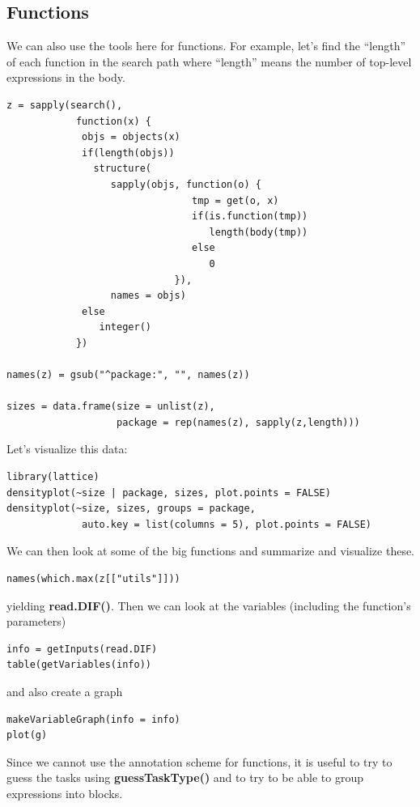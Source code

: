 \documentclass{article}
\def\Rfunc#1{\textbf{#1()}}
\begin{document}
\subsection{Functions}
We can also use the tools here for functions.
For example, let's find the ``length'' of
each function in the search path where ``length''
means the number of top-level expressions in the 
body.
\begin{verbatim}
z = sapply(search(), 
            function(x) {
             objs = objects(x)
             if(length(objs))
               structure(
                  sapply(objs, function(o) { 
                                tmp = get(o, x)
                                if(is.function(tmp)) 
                                   length(body(tmp)) 
                                else 
                                   0
                             }),
                  names = objs)
             else
                integer()
            })

names(z) = gsub("^package:", "", names(z))

sizes = data.frame(size = unlist(z), 
                   package = rep(names(z), sapply(z,length)))
\end{verbatim}
Let's visualize this data:
\begin{verbatim}
library(lattice)
densityplot(~size | package, sizes, plot.points = FALSE)
densityplot(~size, sizes, groups = package, 
             auto.key = list(columns = 5), plot.points = FALSE)
\end{verbatim}
We can then look at some of the big functions and summarize and visualize
these.
\begin{verbatim}
names(which.max(z[["utils"]]))
\end{verbatim}
yielding \Rfunc{read.DIF}.
Then we can look at the variables (including the function's parameters)
\begin{verbatim}
info = getInputs(read.DIF)
table(getVariables(info))
\end{verbatim}
and also create a graph
\begin{verbatim}
makeVariableGraph(info = info)
plot(g)
\end{verbatim}
Since we cannot use the annotation scheme for functions, 
it is useful to try to guess the tasks using
\Rfunc{guessTaskType} and to try to be able to 
group expressions into blocks.
\end{document}
